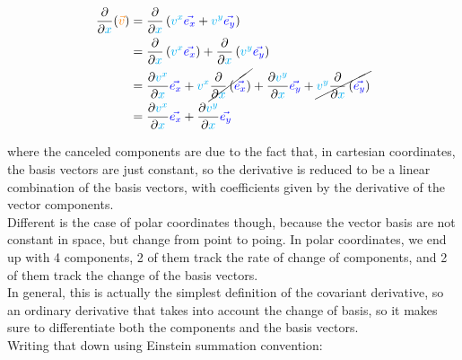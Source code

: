 \begin{align*}
    \frac{\partial}{\partial \begingroup\color{cyan}x\endgroup} (\begingroup\color{orange}\vec{v}\endgroup) &= 
    \frac{\partial}{\partial \begingroup\color{cyan}x\endgroup} \left(\begingroup\color{cyan}v^x\endgroup \begingroup\color{blue}\vec{e_x}\endgroup + \begingroup\color{cyan}v^y\endgroup \begingroup\color{blue}\vec{e_y}\endgroup\right)\\ &=
    \frac{\partial}{\partial \begingroup\color{cyan}x\endgroup} \left(\begingroup\color{cyan}v^x\endgroup \begingroup\color{blue}\vec{e_x}\endgroup\right) + \frac{\partial}{\partial \begingroup\color{cyan}x\endgroup} \left(\begingroup\color{cyan}v^y\endgroup \begingroup\color{blue}\vec{e_y}\endgroup\right)\\ &=
    \frac{\partial \begingroup\color{cyan}v^x\endgroup}{\partial \begingroup\color{cyan}x\endgroup} \begingroup\color{blue}\vec{e_x}\endgroup + \begingroup\color{cyan}v^x\endgroup \cancel{\frac{\partial}{\partial \begingroup\color{cyan}x\endgroup} \left(\begingroup\color{blue}\vec{e_x}\endgroup\right)}
    + \frac{\partial \begingroup\color{cyan}v^y\endgroup}{\partial \begingroup\color{cyan}x\endgroup} \begingroup\color{blue}\vec{e_y}\endgroup + \cancel{\begingroup\color{cyan}v^y\endgroup \frac{\partial}{\partial \begingroup\color{cyan}x\endgroup} \left(\begingroup\color{blue}\vec{e_y}\endgroup\right)}\\
    &= \frac{\partial \begingroup\color{cyan}v^x\endgroup}{\partial \begingroup\color{cyan}x\endgroup} \begingroup\color{blue}\vec{e_x}\endgroup + \frac{\partial \begingroup\color{cyan}v^y\endgroup}{\partial \begingroup\color{cyan}x\endgroup} \begingroup\color{blue}\vec{e_y}\endgroup
\end{align*}

where the canceled components are due to the fact that, in cartesian coordinates, the basis vectors are just constant, so the derivative is reduced to be 
a linear combination of the basis vectors, with coefficients given by the derivative of the vector components.\\

Different is the case of polar coordinates though, because the vector basis are not constant in space, but change from point to poing.
In polar coordinates, we end up with 4 components, 2 of them track the rate of change of components, and 2 of them track the change of the basis vectors.\\

In general, this is actually the simplest definition of the covariant derivative, so an ordinary derivative 
that takes into account the change of basis, so it makes sure to differentiate both the components and the basis vectors.\\
Writing that down using Einstein summation convention:


